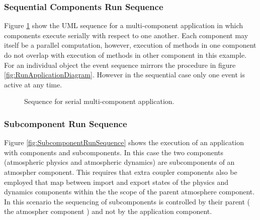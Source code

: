 \subsubsection{Sequential Components Run Sequence}

Figure \ref{fig:SequentialComponentsRunSequence} show the UML sequence
for a multi-component application in which components execute serially
with respect to one another. Each component may itself be a parallel
computation, however, execution of methods in one component do not overlap 
with execution of methods in other component in this example.
For an individual object the event sequence mirrors the procedure in 
figure \ref{fig:RunApplicationDiagram}. However in the sequential
case only one event is active at any time.
\begin{figure}
\caption[{Sequential Component Run}]{Sequence for serial multi-component
application.\\}
\label{fig:SequentialComponentsRunSequence}
\end{figure}

\subsubsection{Subcomponent Run Sequence}
Figure \ref{fig:SubcomponentRunSequence} shows the execution of an
application with components and subcomponents. In this case the 
two components (atmospheric physics and atmospheric dynamics) are 
subcomponents
of an atmospher component. This requires that extra coupler components
also be employed that map between import and export states of the
physics and dynamics components within the the scope of the
parent atmosphere component. In this scenario the sequencing of
subcomponents is controlled by their parent ( the atmospher component )
and not by the application component.

